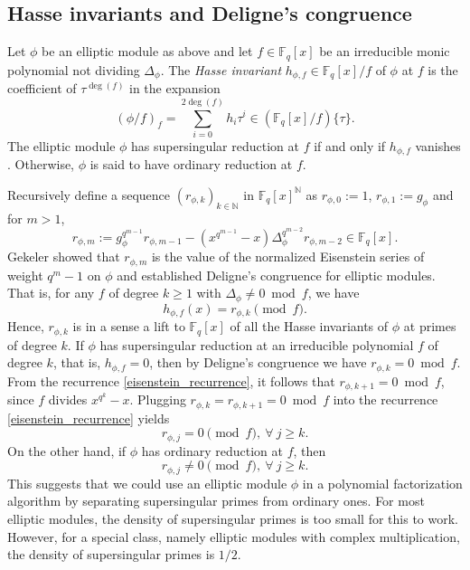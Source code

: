 \documentclass[12pt]{article}
\theoremstyle{plain}
\theoremstyle{definition}
\def\F{\ensuremath{\mathbb{F}}}
\newcommand{\D}{\Delta}
\newcommand{\ph}{(\phi/f)}
\begin{document}
\subsection{Hasse invariants and Deligne's congruence}

Let $\phi$ be an elliptic module as above and let $f \in \F_q[x]$ be an irreducible monic 
polynomial not dividing $\Delta_\phi$. The \textit{Hasse invariant} $h_{\phi,f} \in \F_q[x]/f$ of 
$\phi$ at $f$ is the coefficient of $\tau^{\deg(f)}$ in the expansion 
\[ \ph_f = \sum_{i=0}^{2\deg(f)} h_i \tau^i \in (\F_{q}[x]/f)\{\tau\}. \]
The elliptic module $\phi$ has supersingular reduction at $f$ if and only if $h_{\phi,f}$ vanishes 
\cite{gos}. Otherwise, $\phi$ is said to have ordinary reduction at $f$.

Recursively define a sequence $(r_{\phi,k})_{k \in \mathbb{N}}$ in $\F_q[x]^\mathbb{N}$ as 
$r_{\phi,0}:=1$, $r_{\phi,1}:=g_\phi$ and for $m>1$,
\begin{equation}
\label{eisenstein_recurrence}
	r_{\phi,m} := g_\phi^{q^{m-1}}r_{\phi,m-1} - (x^{q^{m-1}}-x)\D_\phi^{q^{m-2}} r_{\phi,m-2} \in 
	\F_q[x].
\end{equation}
Gekeler \cite[Eq 3.6, Prop 3.7]{gek} showed that $r_{\phi,m}$ is the value of the normalized 
Eisenstein series of weight $q^{m}-1$ on $\phi$ and established Deligne's congruence for elliptic 
modules. That is, for any $f$ of degree $k \geq 1$ with $\Delta_\phi \neq 0 \bmod f$, we have
\begin{equation}
\label{deligne_congruence}
	h_{\phi,f}(x) = r_{\phi,k} \pmod{f}.
\end{equation}
Hence, $r_{\phi,k}$ is in a sense a lift to $\F_q[x]$ of all the Hasse invariants of $\phi$ at 
primes of degree $k$. If $\phi$ has supersingular reduction at an irreducible polynomial $f$ of 
degree $k$, that is, $h_{\phi,f} = 0$, then by Deligne's congruence we have $r_{\phi,k} = 0 \bmod 
f$. From the recurrence \eqref{eisenstein_recurrence}, it follows that $r_{\phi,k+1} = 0 \bmod f$, 
since $f$ divides $x^{q^k} - x$. Plugging $r_{\phi,k} = r_{\phi,k+1} = 0 \bmod f$  into the 
recurrence \eqref{eisenstein_recurrence} yields
\begin{equation}
\label{supersingular_zero}
	r_{\phi,j} = 0 \pmod{f}, ~ \forall~j \ge k.
\end{equation}
On the other hand, if $\phi$ has ordinary reduction at $f$, then \cite[Lemma~2.3]{cor}
\begin{equation}
\label{supersingular_nonzero}
	r_{\phi,j} \neq 0 \pmod{f}, ~ \forall~j \ge k.
\end{equation}
This suggests that we could use an elliptic module $\phi$ in a polynomial factorization algorithm 
by separating supersingular primes from ordinary ones. For most elliptic modules, the density of 
supersingular primes is too small for this to work. However, for a special class, namely elliptic 
modules with complex multiplication, the density of supersingular primes is $1/2$. 
\end{document}
